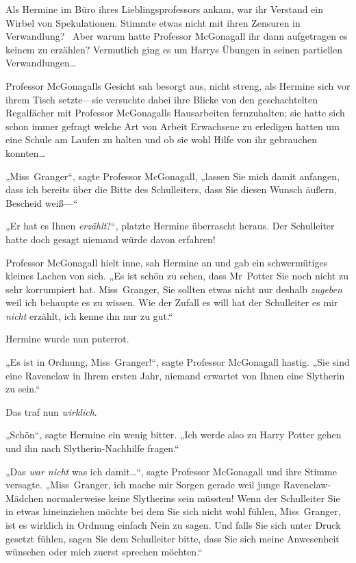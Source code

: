 {Als Hermine im Büro ihres Lieblingsprofessors ankam, war ihr Verstand ein Wirbel von Spekulationen. Stimmte etwas nicht mit ihren Zensuren in Verwandlung? ~Aber warum hatte Professor McGonagall ihr dann aufgetragen es keinem zu erzählen? Vermutlich ging es um Harrys Übungen in seinen partiellen Verwandlungen…

Professor McGonagalls Gesicht sah besorgt aus, nicht streng, als Hermine sich vor ihrem Tisch setzte—sie versuchte dabei ihre Blicke von den geschachtelten Regalfächer mit Professor McGonagalls Hausarbeiten fernzuhalten; sie hatte sich schon immer gefragt welche Art von Arbeit Erwachsene zu erledigen hatten um eine Schule am Laufen zu halten und ob sie wohl Hilfe von ihr gebrauchen konnten…

„Miss~Granger“, sagte Professor McGonagall, „lassen Sie mich damit anfangen, dass ich bereits über die Bitte des Schulleiters, dass Sie diesen Wunsch äußern, Bescheid weiß—“

„Er hat es Ihnen \emph{erzählt}?“, platzte Hermine überrascht heraus. Der Schulleiter hatte doch gesagt niemand würde davon erfahren!

Professor McGonagall hielt inne, sah Hermine an und gab ein schwermütiges kleines Lachen von sich. „Es ist schön zu sehen, dass Mr~Potter Sie noch nicht zu sehr korrumpiert hat. Miss~Granger, Sie sollten etwas nicht nur deshalb \emph{zugeben} weil ich behaupte es zu wissen. Wie der Zufall es will hat der Schulleiter es mir \emph{nicht} erzählt, ich kenne ihn nur zu gut.“

Hermine wurde nun puterrot.

„Es ist in Ordnung, Miss~Granger!“, sagte Professor McGonagall hastig. „Sie sind eine Ravenclaw in Ihrem ersten Jahr, niemand erwartet von Ihnen eine Slytherin zu sein.“

Das traf nun \emph{wirklich}.

„Schön“, sagte Hermine ein wenig bitter. „Ich werde also zu Harry Potter gehen und ihn nach Slytherin-Nachhilfe fragen.“

„Das \emph{war nicht} was ich damit…“, sagte Professor McGonagall und ihre Stimme versagte. „Miss~Granger, ich mache mir Sorgen gerade weil junge Ravenclaw-Mädchen normalerweise keine Slytherins sein müssten! Wenn der Schulleiter Sie in etwas hineinziehen möchte bei dem Sie sich nicht wohl fühlen, Miss~Granger, ist es wirklich in Ordnung einfach Nein zu sagen. Und falls Sie sich unter Druck gesetzt fühlen, sagen Sie dem Schulleiter bitte, dass Sie sich meine Anwesenheit wünschen oder mich zuerst sprechen möchten.“

}
